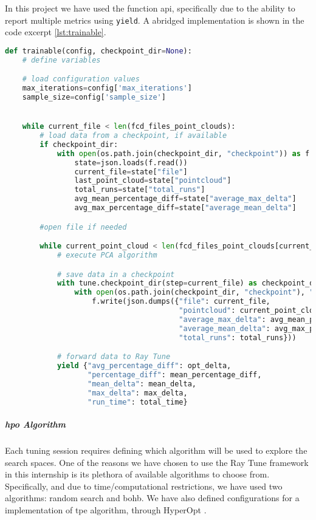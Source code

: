 In this project we have used the function \acrshort{api}, specifically due to the ability to report multiple metrics using \verb!yield!. A abridged implementation is shown in the code excerpt \ref{lst:trainable}.

\begin{lstlisting}[language=Python, caption=Abridged Trainable function, captionpos=b, label={lst:trainable}]
def trainable(config, checkpoint_dir=None):
    # define variables

    # load configuration values
    max_iterations=config['max_iterations']
    sample_size=config['sample_size']


    while current_file < len(fcd_files_point_clouds):
        # load data from a checkpoint, if available 
        if checkpoint_dir:
            with open(os.path.join(checkpoint_dir, "checkpoint")) as f:
                state=json.loads(f.read())
                current_file=state["file"]
                last_point_cloud=state["pointcloud"]
                total_runs=state["total_runs"]
                avg_mean_percentage_diff=state["average_max_delta"]
                avg_max_percentage_diff=state["average_mean_delta"]

        #open file if needed

        while current_point_cloud < len(fcd_files_point_clouds[current_file][1]):
            # execute PCA algorithm

            # save data in a checkpoint
            with tune.checkpoint_dir(step=current_file) as checkpoint_dir:
                with open(os.path.join(checkpoint_dir, "checkpoint"), "w") as f:
                    f.write(json.dumps({"file": current_file,
                                        "pointcloud": current_point_cloud - 1,
                                        "average_max_delta": avg_mean_percentage_diff,
                                        "average_mean_delta": avg_max_percentage_diff,
                                        "total_runs": total_runs}))

            # forward data to Ray Tune
            yield {"avg_percentage_diff": opt_delta,
                   "percentage_diff": mean_percentage_diff,
                   "mean_delta": mean_delta,
                   "max_delta": max_delta,
                   "run_time": total_time}
\end{lstlisting}

\subparagraph{\acrshort{hpo} Algorithm}

Each tuning session requires defining which algorithm will be used to explore the search spaces. One of the reasons we have chosen to use the Ray Tune framework in this internship is its plethora of available algorithms to choose from. Specifically, and due to time/computational restrictions, we have used two algorithms: random search and \acrshort{bohb}. We have also defined configurations for a implementation of \acrshort{tpe} algorithm, through HyperOpt \parencite{10.5555/3042817.3042832}.

